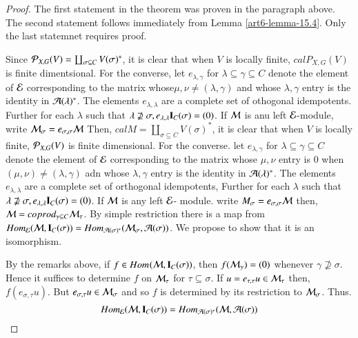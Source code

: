 \begin{proof}
The first statement in the theorem was proven in the paragraph above. The second statement follows immediately from Lemma \ref{art6-lemma-15.4}. Only the last statemnet requires proof.

Since $\mathcal{P}_{X, G}(V) = \coprod_{\sigma \subseteq C}V(\sigma)^{*}$, it is clear that when $V$ is locally finite, $calP_{X, G}(V)$ is finite dimentsional. For the converse, let $e_{\lambda, \gamma}$ for $\lambda \subseteq \gamma \subseteq C$ denote the element of $\mathcal{E}$ corresponding to the matrix whose$ \mu, \nu \neq (\lambda, \gamma)$ and whose $\lambda, \gamma$ entry is the identity in $\mathcal{A}(\lambda)^{*}$. The elements $e_{\lambda, \lambda}$ are a complete set of othogonal idempotents. Further for each  $\lambda$ such that $\lambda \nsupseteq \sigma, e_{\lambda, \lambda}\mathbf{I}_{C}(\sigma) = (0)$. If $\mathcal{M}$ is anu left $\mathcal{E}$-module, write $\mathcal{M}_{\sigma} = e_{\sigma, \sigma}\mathcal{M}$ Then, $calM= \coprod_{\sigma \subseteq C}V(\sigma)^{*}$, it is clear that when $V$ is locally finite, $\mathcal{P}_{X, G}(V)$ is finite dimensional. For the converse. let $e_{\lambda, \gamma}$ for $\lambda\subseteq \gamma \subseteq C$ denote the element of $\mathcal{E}$ corresponding to the matrix whose $\mu, \nu$ entry is $0$ when $(\mu, \nu) \neq (\lambda, \gamma)$ adn whose $\lambda,\gamma$ entry is the identity in $\mathcal{A}(\lambda)^{*}$. The elements $e_{\lambda, \lambda}$ are a complete set of orthogonal idempotents, Further for each $\lambda$ such that $\lambda \nsupseteq \sigma, e_{\lambda, \lambda}\mathbf{I}_{C}(\sigma) = (0)$. If $\mathcal{M}$ is any left $\mathcal{E}$- module. write $M_{\sigma}= e_{\sigma, \sigma}\mathcal{M}$ then, $\mathcal{M} = coprod_{\gamma \subseteq C}\mathcal{M}_{\tau}$. By simple restriction there is a map from $Hom_{\mathcal{E}}(\mathcal{M}, \mathbf{I}_{C}(\sigma))= Hom_{\mathcal{A}(\sigma)^{*}}(\mathcal{M}_{\sigma}, \mathcal{A}(\sigma))$. We propose to show that it is an isomorphism.

By the remarks above, if $ f \in Hom_{\cal}(\mathcal{M}, \mathbf{I}_{C}(\sigma))$, then $f(\mathcal{M}_{\gamma}) = (0)$ whenever $\gamma \nsupseteq \sigma$. Hence it suffices to determine $f$ on $\mathcal{M}_{\tau}$ for $\tau \subseteq \sigma$. If $u=e_{\tau, \tau}u \in \mathcal{M}_{\tau}$ then, $f(e_{\sigma, \tau} u)$. But $e_{\sigma, \tau}u \in \mathcal{M}_{\sigma}$ and so $f$ is determined by its restriction to $\mathcal{M}_{\sigma}$. Thus.
\begin{equation}\label{art6-eq-15.8}
Hom_{\mathcal{E}}(\mathcal{M}, \mathbf{I}_{C}(\sigma)) = Hom_{\mathcal{A}(\sigma)^{*}}(\mathcal{M}, \mathcal{A}(\sigma))
\end{equation}


\end{proof}
